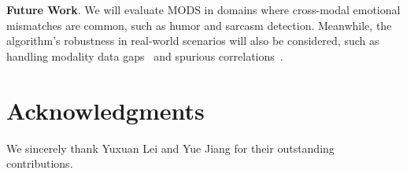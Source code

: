 \documentclass[letterpaper]{article} %
\begin{document}
\noindent \textbf{Future Work}. We will evaluate MODS in domains where cross-modal emotional mismatches are common, such as humor and sarcasm detection.
Meanwhile, the algorithm's robustness in real-world scenarios will also be considered, such as handling modality data gaps~\cite{yang2024TSIF,yang2024asynchronous} and spurious correlations~\cite{yang2024robust,yang2024MCIS}.

\section{Acknowledgments}
We sincerely thank Yuxuan Lei and Yue Jiang for their outstanding contributions.

\end{document}
